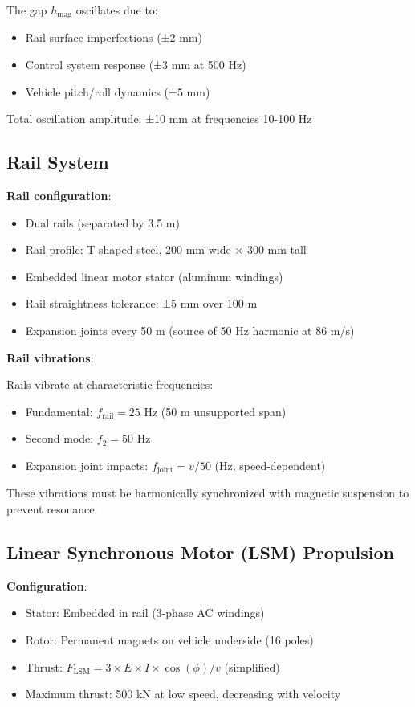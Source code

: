\documentclass[12pt,a4paper]{article}
\begin{document}
The gap $h_{\text{mag}}$ oscillates due to:
\begin{itemize}
\item Rail surface imperfections (±2 mm)
\item Control system response (±3 mm at 500 Hz)
\item Vehicle pitch/roll dynamics (±5 mm)
\end{itemize}

Total oscillation amplitude: ±10 mm at frequencies 10-100 Hz

\subsection{Rail System}

\textbf{Rail configuration}:
\begin{itemize}
\item Dual rails (separated by 3.5 m)
\item Rail profile: T-shaped steel, 200 mm wide × 300 mm tall
\item Embedded linear motor stator (aluminum windings)
\item Rail straightness tolerance: ±5 mm over 100 m
\item Expansion joints every 50 m (source of 50 Hz harmonic at 86 m/s)
\end{itemize}

\textbf{Rail vibrations}:

Rails vibrate at characteristic frequencies:
\begin{itemize}
\item Fundamental: $f_{\text{rail}} = 25$ Hz (50 m unsupported span)
\item Second mode: $f_2 = 50$ Hz
\item Expansion joint impacts: $f_{\text{joint}} = v / 50$ (Hz, speed-dependent)
\end{itemize}

These vibrations must be harmonically synchronized with magnetic suspension to prevent resonance.

\subsection{Linear Synchronous Motor (LSM) Propulsion}

\textbf{Configuration}:
\begin{itemize}
\item Stator: Embedded in rail (3-phase AC windings)
\item Rotor: Permanent magnets on vehicle underside (16 poles)
\item Thrust: $F_{\text{LSM}} = 3 \times E \times I \times \cos(\phi) / v$ (simplified)
\item Maximum thrust: 500 kN at low speed, decreasing with velocity
\end{itemize}
\end{document}

